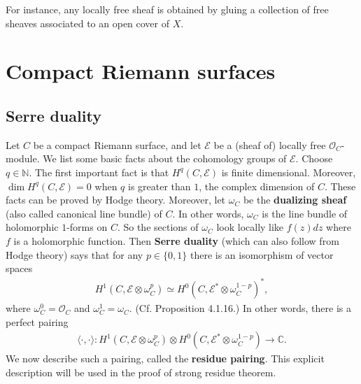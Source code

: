 \documentclass[12pt,a4paper,notitlepage]{report}
\theoremstyle{definition}
\theoremstyle{plain}
\newcommand{\bk}[1]{\langle {#1}\rangle}
\newcommand{\scr}{\mathscr}
\numberwithin{equation}{section}
\begin{document}
For instance, any locally free sheaf is obtained by gluing a collection of free sheaves associated to an open cover of $X$.






\section{Compact Riemann surfaces}\label{lb4}





\subsection*{Serre duality}
 
Let $C$ be a compact Riemann surface, and let $\scr E$ be a (sheaf of) locally free $\scr O_C$-module. We list some basic facts about the cohomology groups of $\scr E$. Choose $q\in\mathbb N$. The first important fact is that $H^q(C,\scr E)$ is finite dimensional. Moreover, $\dim H^q(C,\scr E)=0$ when $q$ is greater than $1$, the complex dimension of $C$. These facts can be proved by Hodge theory. Moreover, let $\omega_C$ be the \textbf{dualizing sheaf} (also called canonical line bundle) of $C$. In other words, $\omega_C$ is the line bundle of holomorphic $1$-forms on $C$. So the sections of $\omega_C$ look locally like $f(z)dz$ where $f$ is a holomorphic function. Then \textbf{Serre duality} (which can also follow from Hodge theory) says that for any $p\in\{0,1\}$ there is an isomorphism of vector spaces
\begin{align}
H^1(C,\scr E\otimes \omega_C^p)\simeq H^0(C,\scr E^*\otimes \omega_C^{1-p})^*,\label{eq2}
\end{align} 
where $\omega_C^0=\scr O_C$ and $\omega_C^1=\omega_C$. (Cf. \cite{Huy06} Proposition 4.1.16.) In other words, there is a perfect pairing
\begin{align}
\bk{\cdot,\cdot}:H^1(C,\scr E\otimes \omega_C^p)\otimes H^0(C,\scr E^*\otimes \omega_C^{1-p})\rightarrow \mathbb C.
\end{align}
We now describe such a pairing, called the \textbf{residue pairing}.  This explicit description will be used in the proof of strong residue theorem.
\end{document}

